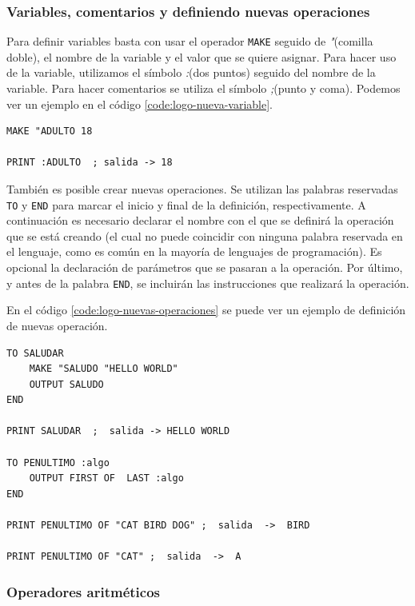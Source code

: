 \subsubsection*{Variables, comentarios y definiendo nuevas operaciones}
\label{sec:logo-variables}

Para definir variables basta con usar el operador \texttt{MAKE} seguido de \emph{"}(comilla doble), el nombre de la variable y el valor que se quiere asignar. Para hacer uso de la variable, utilizamos el símbolo \emph{:}(dos puntos) seguido del nombre de la variable. Para hacer comentarios se utiliza el símbolo \emph{;}(punto y coma). Podemos ver un ejemplo en el código \ref{code:logo-nueva-variable}.

\begin{lstlisting}[language={Logo}, label={code:logo-nueva-variable}, caption={Ejemplo de definición de nuevas variables en el lenguaje Logo.}]
MAKE "ADULTO 18

PRINT :ADULTO  ; salida -> 18
\end{lstlisting}

También es posible crear nuevas operaciones. Se utilizan las palabras reservadas \texttt{TO} y \texttt{END} para marcar el inicio y final de la definición, respectivamente. A continuación es necesario declarar el nombre con el que se definirá la operación que se está creando (el cual no puede coincidir con ninguna palabra reservada en el lenguaje, como es común en la mayoría de lenguajes de programación). Es opcional la declaración de parámetros que se pasaran a la operación. Por último, y antes de la palabra \texttt{END}, se incluirán las instrucciones que realizará la operación.

En el código \ref{code:logo-nuevas-operaciones} se puede ver un ejemplo de definición de nuevas operación.

\begin{lstlisting}[language={Logo}, label={code:logo-nuevas-operaciones}, caption={Definición de nuevas operaciones en el lenguaje Logo.}]
TO SALUDAR
	MAKE "SALUDO "HELLO WORLD"
	OUTPUT SALUDO
END

PRINT SALUDAR  ;  salida -> HELLO WORLD

TO PENULTIMO :algo
	OUTPUT FIRST OF  LAST :algo
END

PRINT PENULTIMO OF "CAT BIRD DOG" ;  salida  ->  BIRD

PRINT PENULTIMO OF "CAT" ;  salida  ->  A
\end{lstlisting}


\subsubsection*{Operadores aritméticos}

